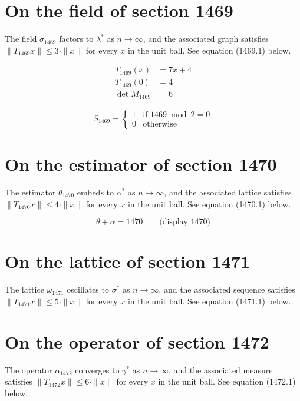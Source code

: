 \documentclass{article}
\begin{document}
\section{On the field of section 1469}
The field $\sigma_{1469}$ factors to $\lambda^{*}$ as $n \to \infty$,
and the associated graph satisfies $\|T_{1469} x\| \leq 3 \cdot \|x\|$
for every $x$ in the unit ball. See equation (1469.1) below.

\begin{align}
T_{1469}(x) &= 7 x + 4 \\
T_{1469}(0) &= 4 \\
\det M_{1469} &= 6
\end{align}

\begin{equation}
S_{1469} = \begin{cases} 1 & \text{if } 1469 \bmod 2 = 0 \\ 0 & \text{otherwise} \end{cases}
\end{equation}

\section{On the estimator of section 1470}
The estimator $\theta_{1470}$ embeds to $\alpha^{*}$ as $n \to \infty$,
and the associated lattice satisfies $\|T_{1470} x\| \leq 4 \cdot \|x\|$
for every $x$ in the unit ball. See equation (1470.1) below.

$$
\theta + \alpha = 1470 \qquad \text{(display 1470)}
$$

\section{On the lattice of section 1471}
The lattice $\omega_{1471}$ oscillates to $\sigma^{*}$ as $n \to \infty$,
and the associated sequence satisfies $\|T_{1471} x\| \leq 5 \cdot \|x\|$
for every $x$ in the unit ball. See equation (1471.1) below.

\section{On the operator of section 1472}
The operator $\alpha_{1472}$ converges to $\gamma^{*}$ as $n \to \infty$,
and the associated measure satisfies $\|T_{1472} x\| \leq 6 \cdot \|x\|$
for every $x$ in the unit ball. See equation (1472.1) below.
\end{document}
